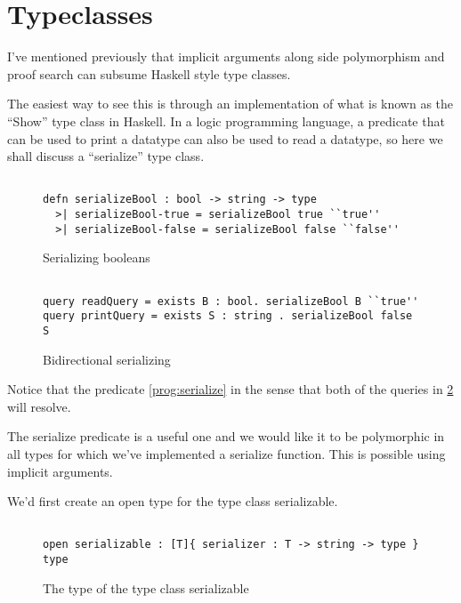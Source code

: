 \section{Typeclasses}


I've mentioned previously that implicit arguments along side polymorphism and proof search can subsume Haskell style type classes.

The easiest way to see this is through an implementation of what is known as the ``Show'' type class in Haskell.  
In a logic programming language, a predicate that can be used to print a datatype can also be used to read a datatype, so here we shall discuss a ``serialize'' type class.


\begin{figure}[H]
\begin{lstlisting}

defn serializeBool : bool -> string -> type
  >| serializeBool-true = serializeBool true ``true''
  >| serializeBool-false = serializeBool false ``false''

\end{lstlisting}
\caption{Serializing booleans}
\label{prog:serializing}
\end{figure}


\begin{figure}[H]
\begin{lstlisting}

query readQuery = exists B : bool. serializeBool B ``true''
query printQuery = exists S : string . serializeBool false S

\end{lstlisting}
\caption{Bidirectional serializing}
\label{prog:bidi}
\end{figure}

Notice that the predicate \ref{prog:serialize} in the sense that both of the queries in 
\ref{prog:bidi} will resolve. 

The serialize predicate is a useful one and we would like it to be polymorphic in all types for which we've implemented a serialize function.  This is possible using implicit arguments.

We'd first create an open type for the type class serializable.

\begin{figure}[H]
\begin{lstlisting}

open serializable : [T]{ serializer : T -> string -> type } type

\end{lstlisting}
\caption{The type of the type class serializable }
\label{prog:sty}
\end{figure}

